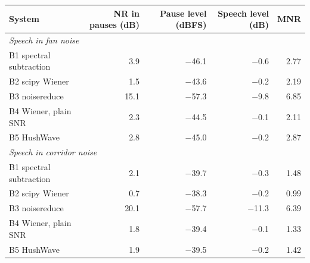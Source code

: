 \begin{tabular}{lrrrr}
\hline
\rowcolor{headfill} \textbf{System} & \textbf{NR in pauses (dB)} & \textbf{Pause level (dBFS)} & \textbf{Speech level (dB)} & \textbf{MNR} \\ \hline
\multicolumn{5}{l}{\emph{Speech in fan noise}} \\ \hline
B1 spectral subtraction & 3.9 & $-$46.1 & $-$0.6 & 2.77 \\ \hline
B2 scipy Wiener & 1.5 & $-$43.6 & $-$0.2 & 2.19 \\ \hline
B3 noisereduce & 15.1 & $-$57.3 & $-$9.8 & 6.85 \\ \hline
B4 Wiener, plain SNR & 2.3 & $-$44.5 & $-$0.1 & 2.11 \\ \hline
B5 HushWave & 2.8 & $-$45.0 & $-$0.2 & 2.87 \\ \hline
\multicolumn{5}{l}{\emph{Speech in corridor noise}} \\ \hline
B1 spectral subtraction & 2.1 & $-$39.7 & $-$0.3 & 1.48 \\ \hline
B2 scipy Wiener & 0.7 & $-$38.3 & $-$0.2 & 0.99 \\ \hline
B3 noisereduce & 20.1 & $-$57.7 & $-$11.3 & 6.39 \\ \hline
B4 Wiener, plain SNR & 1.8 & $-$39.4 & $-$0.1 & 1.33 \\ \hline
B5 HushWave & 1.9 & $-$39.5 & $-$0.2 & 1.42 \\ \hline
\end{tabular}
